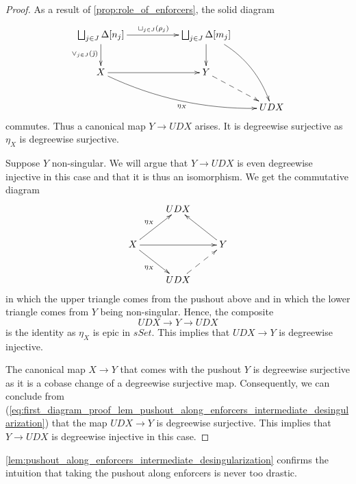 \begin{proof}
As a result of \cref{prop:role_of_enforcers}, the solid diagram
\begin{displaymath}
\xymatrix{
\bigsqcup _{j\in J}\Delta [n_j] \ar[rr]^{\sqcup _{j\in J}(\rho _j)} \ar[d]_{\vee _{j\in J}(\bar{\jmath } )} && \bigsqcup _{j\in J}\Delta [m_j] \ar[d] \ar@/^1pc/[ddr] \\ 
X \ar@/_1pc/[drrr]_{\eta _X} \ar[rr] && Y \ar@{-->}[dr] \\
&&& UDX
}
\end{displaymath}
commutes. Thus a canonical map $Y\to UDX$ arises. It is degreewise surjective as $\eta _X$ is degreewise surjective.

Suppose $Y$ non-singular. We will argue that $Y\to UDX$ is even degreewise injective in this case and that it is thus an isomorphism. We get the commutative diagram
\begin{equation}
\label{eq:first_diagram_proof_lem_pushout_along_enforcers_intermediate_desingularization}
\begin{gathered}
\xymatrix{
& UDX \\
X \ar[dr]_{\eta _X} \ar[ur]^{\eta _X} \ar[rr] && Y \ar[lu] \\
& UDX \ar@{-->}[ur]
}
\end{gathered}
\end{equation}
in which the upper triangle comes from the pushout above and in which the lower triangle comes from $Y$ being non-singular. Hence, the composite
\[UDX\to Y\to UDX\]
is the identity as $\eta _X$ is epic in $sSet$. This implies that $UDX\to Y$ is degreewise injective.

The canonical map $X\to Y$ that comes with the pushout $Y$ is degreewise surjective as it is a cobase change of a degreewise surjective map. Consequently, we can conclude from (\ref{eq:first_diagram_proof_lem_pushout_along_enforcers_intermediate_desingularization}) that the map $UDX\to Y$ is degreewise surjective. This implies that $Y\to UDX$ is degreewise injective in this case.
\end{proof}
\noindent \cref{lem:pushout_along_enforcers_intermediate_desingularization} confirms the intuition that taking the pushout along enforcers is never too drastic.


